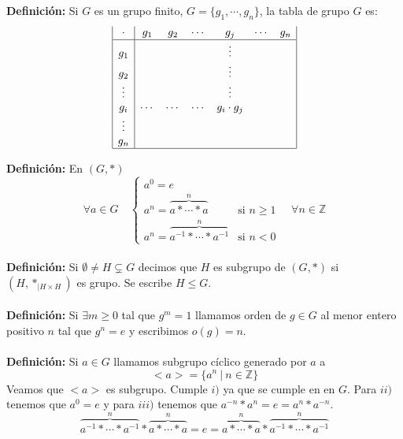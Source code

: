 \documentclass{article}
\begin{document}
\textbf{Definición:} Si $G$ es un grupo finito, $G=\{g_1,\cdots,g_n\}$, la tabla de grupo $G$ es:
$$
\begin{array}{|c|cccccc|}
    \cdot   & g_1    & g_2    & \cdots &   g_j        & \cdots & g_n \\\hline
     g_1    &        &        &        & \vdots       &        &     \\ 
     g_2    &        &        &        & \vdots       &        &     \\
     \vdots &        &        &        & \vdots       &        &     \\
     g_i    & \cdots & \cdots & \cdots & g_i\cdot g_j &        &     \\
     \vdots &        &        &        &              &        &     \\
     g_n    &        &        &        &              &        &     \\\hline
\end{array}
$$


\textbf{Definición:} En $(G,*)$
$$
\forall a \in G \quad
\left\{\begin{array}{ll}
    a^0=e\\
    a^n=\overbrace{a*\cdots*a}^n & \text{si }n\ge 1 \\
    a^n=\overbrace{a^{-1}*\cdots*a^{-1}}^n & \text{si }n< 0
\end{array}\right. \quad \forall n \in \mathbb{Z}
$$\\


\textbf{Definición:} Si $\emptyset \ne H\subsetneq G$ decimos que $H$ es subgrupo de $(G,*)$ si $(H,*_{|H\times H})$ es grupo. Se escribe $H \le G$.\\\\
\textbf{Definición:} Si $\exists m\ge 0$ tal que $g^m=1$ llamamos orden de $g\in G$ al menor entero positivo $n$ tal que $g^n=e$ y escribimos $o(g)=n$.\\\\


\textbf{Definición:} Si $a\in G$ llamamos subgrupo cíclico generado por $a$ a
$$
<a>=\{a^n\:|\:n\in\mathbb{Z}\}
$$
Veamos que $<a>$ es subgrupo. Cumple $i)$ ya que se cumple en en $G$. Para $ii)$ tenemos que $a^0=e$ y para $iii)$ tenemos que $a^{-n}*a^n=e=a^n*a^{-n}$.
$$
\overbrace{a^{-1}*\cdots*a^{-1}}^n*\overbrace{a*\cdots*a}^n=e=\overbrace{a*\cdots*a}^n*\overbrace{a^{-1}*\cdots*a^{-1}}^n
$$\\
\end{document}
